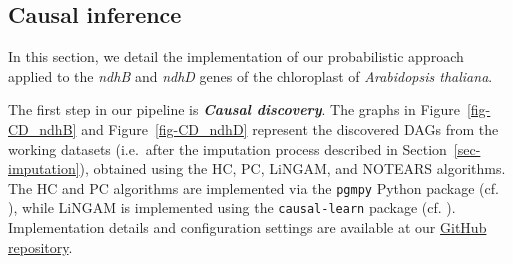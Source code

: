 \documentclass[
]{article}
\theoremstyle{definition}
\theoremstyle{remark}
\begin{document}
\subsection{Causal inference}\label{sec-quantitative-causality}

In this section, we detail the implementation of our probabilistic
approach applied to the \emph{ndhB} and \emph{ndhD} genes of the
chloroplast of \emph{Arabidopsis thaliana}.

The first step in our pipeline is \textbf{\emph{Causal discovery}}. The
graphs in Figure~\ref{fig-CD_ndhB} and Figure~\ref{fig-CD_ndhD}
represent the discovered DAGs from the working datasets (i.e.~after the
imputation process described in Section~\ref{sec-imputation}), obtained
using the HC, PC, LiNGAM, and NOTEARS algorithms. The HC and PC
algorithms are implemented via the \texttt{pgmpy} Python package (cf.
), while LiNGAM is implemented
using the \texttt{causal-learn} package (cf.
). Implementation details and
configuration settings are available at our
\href{https://github.com/rmartosprieto/chloroDAG.git}{GitHub
repository}.
\end{document}

